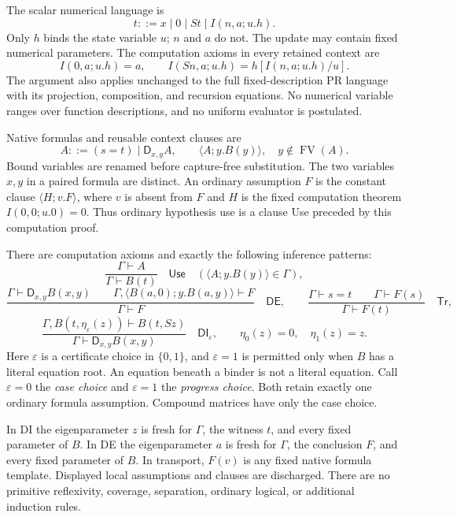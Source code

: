 \documentclass[11pt,letterpaper]{article}
\theoremstyle{definition}\newtheorem{definition}[theorem]{Definition}
\theoremstyle{remark}\newtheorem{remark}[theorem]{Remark}
\begin{document}
The scalar numerical language is
\[
 t::=x\mid0\mid St\mid I(n,a;u.h).
\]
Only $h$ binds the state variable $u$; $n$ and $a$ do not.
The update may contain fixed numerical parameters. The computation
axioms in every retained context are
\[
 I(0,a;u.h)=a,\qquad
 I(Sn,a;u.h)=h[I(n,a;u.h)/u].
 \tag{I0, IS}\label{eq:choice-computations}
\]
The argument also applies unchanged to the full fixed-description PR
language with its projection, composition, and recursion equations.
No numerical variable ranges over function descriptions, and no uniform
evaluator is postulated.

Native formulas and reusable context clauses are
\[
 A::=(s=t)\mid\mathsf D_{x,y}A,\qquad
 \langle A;y.B(y)\rangle,\quad y\notin\operatorname{FV}(A).
\]
Bound variables are renamed before capture-free substitution.
The two variables $x,y$ in a paired formula are distinct.
An ordinary assumption $F$ is the constant clause
$\langle H;v.F\rangle$, where $v$ is absent from $F$ and $H$ is the
fixed computation theorem $I(0,0;u.0)=0$. Thus ordinary hypothesis
use is a clause Use preceded by this computation proof.

There are computation axioms and exactly the following inference
patterns:
\[
\frac{\Gamma\vdash A}{\Gamma\vdash B(t)}
\quad\mathsf{Use}
\quad(\langle A;y.B(y)\rangle\in\Gamma),
\]
\[
\frac{\Gamma\vdash\mathsf D_{x,y}B(x,y)\qquad
      \Gamma,\langle B(a,0);y.B(a,y)\rangle\vdash F}
     {\Gamma\vdash F}
\quad\mathsf{DE},
\qquad
\frac{\Gamma\vdash s=t\qquad\Gamma\vdash F(s)}
     {\Gamma\vdash F(t)}
\quad\mathsf{Tr},
\]
\[
\frac{\Gamma,B(t,\eta_\varepsilon(z))\vdash B(t,Sz)}
     {\Gamma\vdash\mathsf D_{x,y}B(x,y)}
\quad\mathsf{DI}_{\varepsilon},
\qquad
\eta_0(z)=0,\quad\eta_1(z)=z.
\tag{Choice DI}\label{eq:choice-di}
\]
Here $\varepsilon$ is a certificate choice in $\{0,1\}$, and
$\varepsilon=1$ is permitted only when $B$ has a literal equation
root. An equation beneath a binder is not a literal equation.
Call $\varepsilon=0$ the \emph{case choice} and $\varepsilon=1$
the \emph{progress choice}. Both retain exactly one ordinary
formula assumption. Compound matrices have only the case choice.

In DI the eigenparameter $z$ is fresh for $\Gamma$, the witness
$t$, and every fixed parameter of $B$. In DE the eigenparameter
$a$ is fresh for $\Gamma$, the conclusion $F$, and every fixed
parameter of $B$. In transport, $F(v)$ is any fixed native
formula template. Displayed local assumptions and clauses are
discharged. There are no primitive reflexivity, coverage,
separation, ordinary logical, or additional induction rules.
\end{document}
